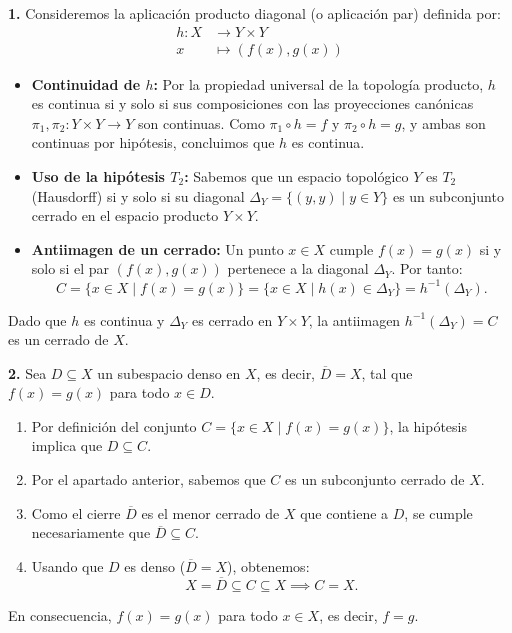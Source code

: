 \begin{sol}
    \textbf{1.} Consideremos la aplicación producto diagonal (o aplicación par) definida por:
\begin{align*}
    h: X &\longrightarrow Y \times Y \\
    x &\longmapsto (f(x), g(x))
\end{align*}
\begin{itemize}
    \item \textbf{Continuidad de $h$:} Por la propiedad universal de la topología producto, $h$ es continua si y solo si sus composiciones con las proyecciones canónicas $\pi_1, \pi_2: Y \times Y \to Y$ son continuas. Como $\pi_1 \circ h = f$ y $\pi_2 \circ h = g$, y ambas son continuas por hipótesis, concluimos que $h$ es continua.
    \item \textbf{Uso de la hipótesis $T_2$:} Sabemos que un espacio topológico $Y$ es $T_2$ (Hausdorff) si y solo si su diagonal $\Delta_Y = \{(y, y) \mid y \in Y\}$ es un subconjunto cerrado en el espacio producto $Y \times Y$.
    \item \textbf{Antiimagen de un cerrado:} Un punto $x \in X$ cumple $f(x) = g(x)$ si y solo si el par $(f(x), g(x))$ pertenece a la diagonal $\Delta_Y$. Por tanto:
    \[
        C = \{x \in X \mid f(x) = g(x)\} = \{x \in X \mid h(x) \in \Delta_Y\} = h^{-1}(\Delta_Y).
    \]
\end{itemize}
Dado que $h$ es continua y $\Delta_Y$ es cerrado en $Y \times Y$, la antiimagen $h^{-1}(\Delta_Y) = C$ es un cerrado de $X$.

\vspace{0.3cm}
\noindent\textbf{2.} Sea $D \subseteq X$ un subespacio denso en $X$, es decir, $\overline{D} = X$, tal que $f(x) = g(x)$ para todo $x \in D$.
\begin{enumerate}
    \item Por definición del conjunto $C = \{x \in X \mid f(x) = g(x)\}$, la hipótesis implica que $D \subseteq C$.
    \item Por el apartado anterior, sabemos que $C$ es un subconjunto cerrado de $X$.
    \item Como el cierre $\overline{D}$ es el menor cerrado de $X$ que contiene a $D$, se cumple necesariamente que $\overline{D} \subseteq C$.
    \item Usando que $D$ es denso ($\overline{D} = X$), obtenemos:
    \[
        X = \overline{D} \subseteq C \subseteq X \implies C = X.
    \]
\end{enumerate}
En consecuencia, $f(x) = g(x)$ para todo $x \in X$, es decir, $f = g$.


\end{sol}
